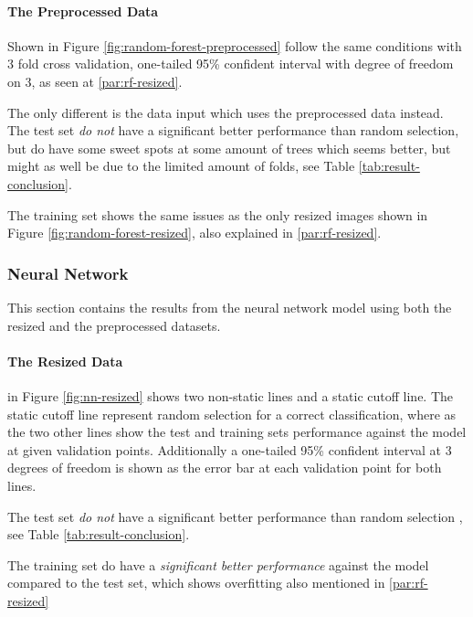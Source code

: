 \paragraph{The Preprocessed Data}
Shown in Figure \ref{fig:random-forest-preprocessed} follow the same conditions with 3 fold cross validation, one-tailed 95\% confident interval with degree of freedom on 3, as seen at \ref{par:rf-resized}.

The only different is the data input which uses the preprocessed data instead.
The test set \emph{do not} have a significant better performance than random selection, but do have some sweet spots at some amount of trees which seems better, but might as well be due to the limited amount of folds, see Table \ref{tab:result-conclusion}.

The training set shows the same issues as the only resized images shown in Figure \ref{fig:random-forest-resized}, also explained in \ref{par:rf-resized}.

\subsubsection{Neural Network}
\label{subsubsec:neuralnetwork}
This section contains the results from the neural network model using both the resized and the preprocessed datasets.

\paragraph{The Resized Data}
in Figure \ref{fig:nn-resized} shows two non-static lines and a static cutoff line.
The static cutoff line represent random selection for a correct classification, where as the two other lines show the test and training sets performance against the model at given validation points. Additionally a one-tailed 95\% confident interval at 3 degrees of freedom is shown as the error bar at each validation point for both lines.

The test set \emph{do not} have a significant better performance than random selection
, see Table \ref{tab:result-conclusion}.

The training set do have a \emph{significant better performance} against the model compared to the test set, which shows overfitting also mentioned in \ref{par:rf-resized}


